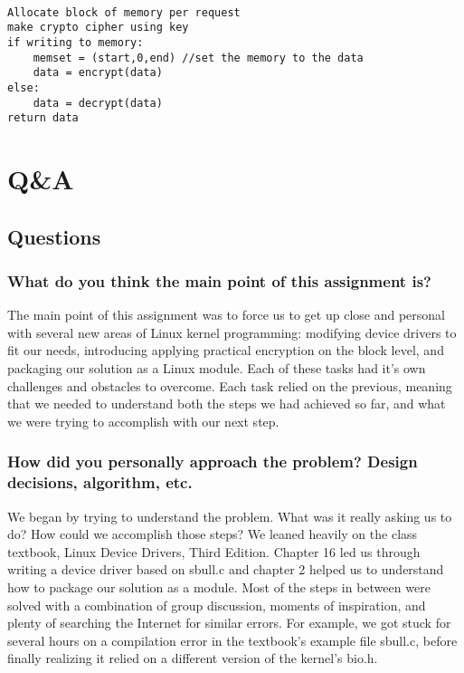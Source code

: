 \documentclass[journal,10pt,onecolumn,compsoc,letterpaper,draftclsnofoot,table,xcdraw]{IEEEtran} \usepackage[margin=0.75in]{geometry}
\begin{document}
\begin{verbatim}

Allocate block of memory per request
make crypto cipher using key
if writing to memory:
	memset = (start,0,end) //set the memory to the data
	data = encrypt(data)
else:
	data = decrypt(data)
return data

\end{verbatim}

\section{Q\&A}
\subsection{Questions}
\subsubsection{What do you think the main point of this assignment is?}

\noindent The main point of this assignment was to force us to get up close and personal with several new areas of Linux kernel programming: modifying device drivers to fit our needs, introducing applying practical encryption on the block level, and packaging our solution as a Linux module.  Each of these tasks had it's own challenges and obstacles to overcome.  Each task relied on the previous, meaning that we needed to understand both the steps we had achieved so far, and what we were trying to accomplish with our next step.

\subsubsection{How did you personally approach the problem? Design decisions, algorithm, etc.}

\noindent We began by trying to understand the problem.  What was it really asking us to do?  How could we accomplish those steps?  We leaned heavily on the class textbook, Linux Device Drivers, Third Edition.  Chapter 16 led us through writing a device driver based on sbull.c and chapter 2 helped us to understand how to package our solution as a module.  Most of the steps in between were solved with a combination of group discussion, moments of inspiration, and plenty of searching the Internet for similar errors.  For example, we got stuck for several hours on a compilation error in the textbook's example file sbull.c, before finally realizing it relied on a different version of the kernel's bio.h.
\end{document}
